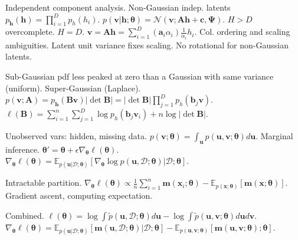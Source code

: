 \documentclass[twocolumn]{article}
\begin{document}
Independent component analysis. Non-Gaussian indep. latents $p_\mathbf{h}(\mathbf{h})=\prod_{i=1}^D p_h(h_i)$. $p(\mathbf{v}|\mathbf{h};\bm{\theta})=\mathcal{N}(\mathbf{v};\mathbf{A}\mathbf{h}+\mathbf{c},\bm{\Psi})$. $H>D$ overcomplete. $H=D$. $\mathbf{v}=\mathbf{Ah}=\sum_{i=1}^D(\mathbf{a}_i\alpha_i)\frac{1}{\alpha_i}h_i$. Col. ordering and scaling ambiguities. Latent unit variance fixes scaling. No rotational for non-Gaussian latents.

Sub-Gaussian pdf less peaked at zero than a Gaussian with same variance (uniform). Super-Gaussian (Laplace).\\
$p(\mathbf{v};\mathbf{A})=p_\mathbf{h}(\mathbf{B}\mathbf{v})|\det \mathbf{B}|=|\det \mathbf{B}|\prod_{j=1}^D p_h(\mathbf{b}_j\mathbf{v})$.\\
$\ell(\mathbf{B})=\sum_{i=1}^n\sum_{j=1}^D\log p_h(\mathbf{b}_j\mathbf{v}_i)+n\log|\det\mathbf{B}|$.

Unobserved vars: hidden, missing data. $p(\mathbf{v};\bm{\theta})=\int_\mathbf{u}p(\mathbf{u},\mathbf{v};\bm{\theta})d\mathbf{u}$. Marginal inference. $\bm{\theta}'=\bm{\theta}+\epsilon\nabla_{\bm{\theta}}\ell(\bm{\theta})$.\\
$\nabla_{\bm{\theta}}\ell(\bm{\theta})=\mathbb{E}_{p(\mathbf{u}|\mathcal{D};\bm{\theta})}[\nabla_{\bm{\theta}}\log p(\mathbf{u},\mathcal{D};\bm{\theta})|\mathcal{D};\bm{\theta}]$.

Intractable partition. $\nabla_{\bm{\theta}}\ell(\bm{\theta})\propto\frac{1}{n}\sum_{i=1}^{n} \bm{m}(\bm{x}_i;\bm{\theta})-\mathbb{E}_{p(\bm{x};\bm{\theta})}[\bm{m}(\bm{x};\bm{\theta})]$. Gradient ascent, computing expectation.

Combined. $\ell(\bm{\theta})=\log\int\tilde{p}(\mathbf{u},\mathcal{D};\bm{\theta})d\mathbf{u}-\log\int\tilde{p}(\mathbf{u},\mathbf{v};\bm{\theta})d\mathbf{u}d\mathbf{v}$.\\
$\nabla_{\bm{\theta}}\ell(\bm{\theta})=\mathbb{E}_{p(\mathbf{u}|\mathcal{D};\bm{\theta})}[\mathbf{m}(\mathbf{u},\mathcal{D};\bm{\theta})|\mathcal{D};\bm{\theta}]-\mathbb{E}_{p(\mathbf{u},\mathbf{v};\bm{\theta})}[\mathbf{m}(\mathbf{u},\mathbf{v};\bm{\theta});\bm{\theta}]$.
\end{document}
